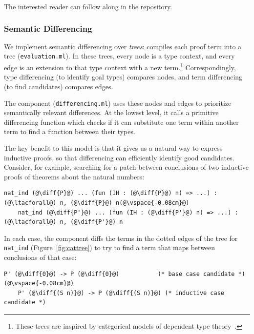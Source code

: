 The interested reader can follow along in the repository.

\subsubsection{Semantic Differencing} We implement semantic differencing over \emph{trees}:
\sysname compiles each proof term into a tree (\lstinline{evaluation.ml}). In these trees,
every node is a type context, and every edge is an extension to that type context with a 
new term.\footnote{These trees are inspired by categorical models of dependent type theory~\cite{Hofmann97}.}
Correspondingly, type differencing (to identify goal types) compares nodes, 
and term differencing (to find candidates) compares edges. 

The component (\lstinline{differencing.ml}) uses these nodes and edges to prioritize semantically
relevant differences. At the lowest level, it calls a primitive differencing function 
which checks if it can substitute one term within another term to find a function between their types.


The key benefit to this model is that it gives us a natural way to express inductive proofs, so
that differencing can efficiently identify good candidates.
Consider, for example, searching for a patch between conclusions of two inductive proofs of theorems about the natural numbers:

\begin{lstlisting}[language=coq]
    nat_ind (@\diff{P}@) ... (fun (IH : (@\diff{P}@) n) => ...) : (@\ltacforall@) n, (@\diff{P}@) n(@\vspace{-0.08cm}@)
    nat_ind (@\diff{P'}@) ... (fun (IH : (@\diff{P'}@) n) => ...) : (@\ltacforall@) n, (@\diff{P'}@) n
\end{lstlisting}

In each case, the component diffs the terms in the dotted edges of the tree for \lstinline{nat_ind} (Figure~\ref{fig:cattree}) to
try to find a term that maps between conclusions of that case:

\begin{lstlisting}[language=coq]
    P' (@\diff{0}@) -> P (@\diff{0}@)           (* base case candidate *)(@\vspace{-0.08cm}@)
    P' (@\diff{(S n)}@) -> P (@\diff{(S n)}@) (* inductive case candidate *)
\end{lstlisting}

